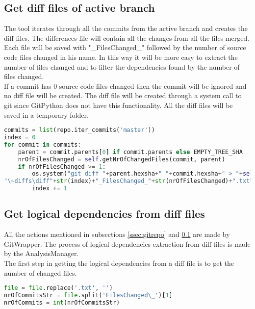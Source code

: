 \subsection{Get diff files of active branch}
\label{ssec:gitdiff}
\tab The tool iterates through all the commits from the active branch and creates the diff files. The diﬀerences ﬁle will contain all the changes from all the ﬁles merged. Each file will be saved with "\_FilesChanged\_" followed by the number of source code ﬁles changed in his name. In this way it will be more easy to extract the number of files changed and to filter the dependencies found by the number of files changed. \\ If a commit has 0 source code files changed then the commit will be ignored and no diff file will be created. The diff file will be created through a system call to git since GitPython does not have this functionality.
All the diff files will be saved in a temporary folder. 

\begin{lstlisting}[language=python, caption={Creating the diff files of the active branch commits.}]
commits = list(repo.iter_commits('master'))
index = 0
for commit in commits:
    parent = commit.parents[0] if commit.parents else EMPTY_TREE_SHA
    nrOfFilesChanged = self.getNrOfChangedFiles(commit, parent)
    if nrOfFilesChanged >= 1:
        os.system("git diff "+parent.hexsha+" "+commit.hexsha+" > "+self.repo_path+
"\~diffs\diff"+str(index)+"_FilesChanged_"+str(nrOfFilesChanged)+".txt")
        index += 1
\end{lstlisting}

\subsection{Get logical dependencies from diff files}
\tab All the actions mentioned in subsections \ref{ssec:gitrepo}  and \ref{ssec:gitdiff} are made by GitWrapper. The process of logical dependencies extraction from diff files is made by the AnalysisManager.\\
The first step in getting the logical dependencies from a diff file is to get the number of changed files.

\begin{lstlisting}[language=python, caption={Get number of changed files from file name.}]
file = file.replace('.txt', '')
nrOfCommitsStr = file.split('FilesChanged\_')[1]
nrOfCommits = int(nrOfCommitsStr)
\end{lstlisting}

